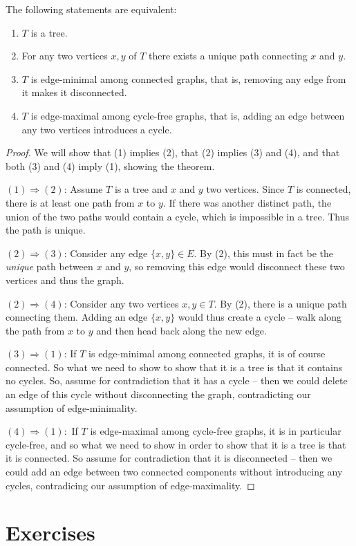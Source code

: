 \documentclass[nobib]{tufte-handout}
\begin{document}
\begin{theorem}
  The following statements are equivalent:
  \begin{enumerate}
    \item $T$ is a tree.
    \item For any two vertices $x, y$ of $T$ there exists a unique path connecting $x$ and $y$.
    \item $T$ is edge-minimal among connected graphs, that is, removing any edge from it makes it disconnected.
    \item $T$ is edge-maximal among cycle-free graphs, that is, adding an edge between any two vertices introduces a cycle.
  \end{enumerate}

  \begin{proof}
    We will show that (1) implies (2), that (2) implies (3) and (4), and that both (3) and (4) imply (1), showing the theorem.

    $(1) \Rightarrow (2)$: Assume $T$ is a tree and $x$ and $y$ two vertices. Since $T$ is connected, there is at least one path from $x$ to $y$. If there was another distinct path, the union of the two paths would contain a cycle, which is impossible in a tree. Thus the path is unique.

    $(2) \Rightarrow (3)$: Consider any edge $\{x,y\} \in E$. By (2), this must in fact be the \emph{unique} path between $x$ and $y$, so removing this edge would disconnect these two vertices and thus the graph.

    $(2) \Rightarrow (4)$: Consider any two vertices $x, y \in T$. By (2), there is a unique path connecting them. Adding an edge $\{x,y\}$ would thus create a cycle -- walk along the path from $x$ to $y$ and then head back along the new edge.

    $(3) \Rightarrow (1)$: If $T$ is edge-minimal among connected graphs, it is of course connected. So what we need to show to show that it is a tree is that it contains no cycles. So, assume for contradiction that it has a cycle -- then we could delete an edge of this cycle without disconnecting the graph, contradicting our assumption of edge-minimality.

    $(4) \Rightarrow (1):$ If $T$ is edge-maximal among cycle-free graphs, it is in particular cycle-free, and so what we need to show in order to show that it is a tree is that it is connected. So assume for contradiction that it is disconnected -- then we could add an edge between two connected components without introducing any cycles, contradicing our assumption of edge-maximality.
  \end{proof}
\end{theorem}

\section{Exercises}

%
%
\end{document}
